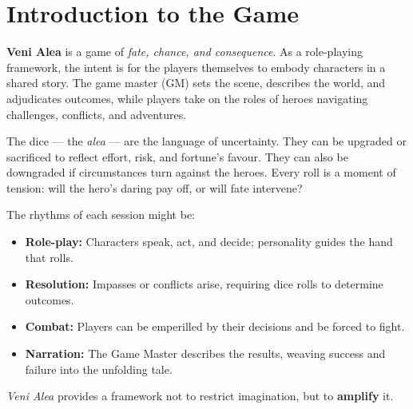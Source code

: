 \section{Introduction to the Game}

\noindent
\textbf{Veni Alea} is a game of \textit{fate, chance, and consequence}.  
As a role-playing framework, the intent is for the players themselves to embody characters in a shared story.  The game master (GM) sets the scene, describes the world, and adjudicates outcomes, while players take on the roles of heroes navigating challenges, conflicts, and adventures.

The dice — the \textit{alea} — are the language of uncertainty.  They can be upgraded or sacrificed to reflect effort, risk, and fortune’s favour.  They can also be downgraded if circumstances turn against the heroes.  Every roll is a moment of tension: will the hero’s daring pay off, or will fate intervene?

The rhythms of each session might be:
\begin{itemize}
  \item \textbf{Role-play:} Characters speak, act, and decide; personality guides the hand that rolls.  
  \item \textbf{Resolution:} Impasses or conflicts arise, requiring dice rolls to determine outcomes.
  \item \textbf{Combat:} Players can be emperilled by their decisions and be forced to fight.
  \item \textbf{Narration:} The Game Master describes the results, weaving success and failure into the unfolding tale.
\end{itemize}

\medskip
\noindent
\textit{Veni Alea} provides a framework not to restrict imagination, but to \textbf{amplify} it.  
